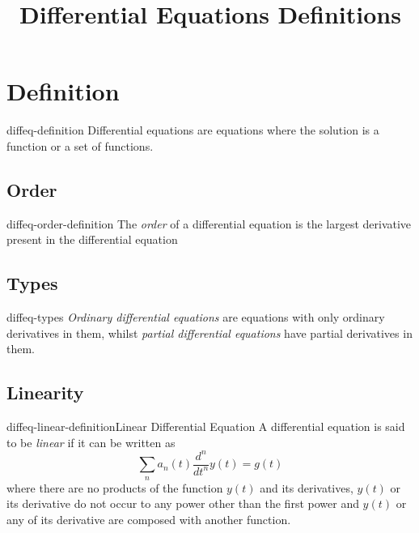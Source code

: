 \documentclass[preview]{standalone}
\begin{document}
\title{Differential Equations Definitions}
\genpage

\section{Definition}

\begin{snippet}{diffeq-definition}
Differential equations are equations where the solution is a function
or a set of functions.
\end{snippet}

\subsection{Order}

\begin{snippet}{diffeq-order-definition}
The \textit{order} of a differential equation is the largest derivative present in the
differential equation
\end{snippet}

\subsection{Types}

\begin{snippet}{diffeq-types}
\textit{Ordinary differential equations} are equations with only
ordinary derivatives in them, whilst \textit{partial differential equations}
have partial derivatives in them.
\end{snippet}

\subsection{Linearity}

\begin{snippetdefinition}{diffeq-linear-definition}{Linear Differential Equation}
    A differential equation is said to be \textit{linear} if it can be written as
    \[
        \sum_n a_n(t) \frac{d^n}{dt^n}y(t)=g(t)
    \]
    where there are no products of the function \(y(t)\) and its derivatives,
    \(y(t)\) or its derivative do not occur to any power other than the first power
    and \(y(t)\) or any of its derivative are composed with another function.
\end{snippetdefinition}
\end{document}
